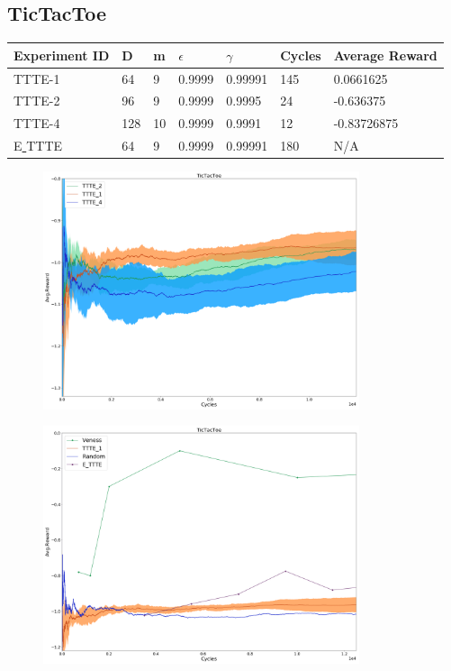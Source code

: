 \documentclass{article}
\theoremstyle{definition}
\newtheorem{primary statistics}[definition]{Primary Statistics}
\newtheorem{auxiliary statistics}[definition]{Auxiliary Statistics}
\begin{document}
\newpage

\subsection{TicTacToe}
\begin{tabular}{|l|l|l|l|l|l|l|}
 \hline \centering
 Experiment ID& D & m & $\epsilon$ & $\gamma$ & Cycles & Average Reward \\ \hline
TTTE-1   & 64        & 9           & 0.9999      & 0.99991           & 145    & 0.0661625         \\ \hline
TTTE-2   & 96        & 9           & 0.9999      & 0.9995            & 24     & -0.636375         \\ \hline
TTTE-4   & 128       & 10          & 0.9999      & 0.9991            & 12     & -0.83726875  \\  \hline  
E\underline{ }TTTE  & 64       & 9          & 0.9999      & 0.99991            & 180     & N/A  \\  \hline    
\end{tabular}

 \begin{figure}[h]
 \centering
    \includegraphics[width=9.3cm]{4_TicTacToe}
\end{figure}

 \begin{figure}[h]
 \centering
    \includegraphics[width=9.3cm]{TicTacToe}
\end{figure}
\end{document}
